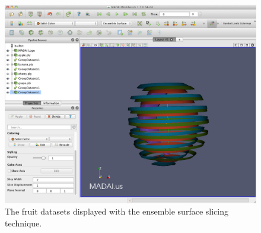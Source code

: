 \documentclass[12pt]{article}
\begin{document}
\begin{figure}[htbp]
   \centering
   \includegraphics[scale=.25]{images/ESSSurfaces.png} %
   \caption{The fruit datasets displayed with the ensemble surface slicing technique.}
   \label{fig:ESSSurfaces}
\end{figure}




\end{document}
